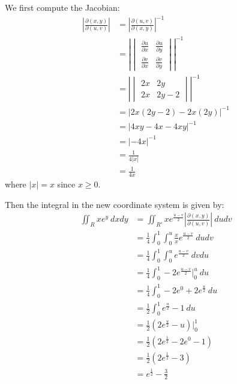 \begin{solution}
    We first compute the Jacobian:
    \begin{align*}
        \left|\frac{\partial(x, y)}{\partial(u, v)}\right| &= \left|\frac{\partial(u, v)}{\partial(x, y)}\right|^{-1} \\
        &= \left|\begin{vmatrix}
            \frac{\partial u}{\partial x} & \frac{\partial u}{\partial y} \\
            \frac{\partial v}{\partial x} & \frac{\partial v}{\partial y}
        \end{vmatrix}\right|^{-1} \\
        &= \left|\begin{vmatrix}
            2x & 2y \\
            2x & 2y - 2
        \end{vmatrix}\right|^{-1} \\
        &= \left|2x(2y - 2) - 2x(2y)\right|^{-1} \\
        &= \left|4xy - 4x - 4xy\right|^{-1} \\
        &= \left|-4x\right|^{-1} \\
        &= \frac{1}{4|x|} \\
        &= \frac{1}{4x}
    \end{align*}
    where \(|x| = x\) since \(x \geq 0\).
    
    Then the integral in the new coordinate system is given by:
    \begin{align*}
        \iint_R xe^y \ dxdy &= \iint_{R'} xe^{\frac{u - v}{2}} \left|\frac{\partial(x, y)}{\partial(u, v)}\right| \ du dv \\
        &= \frac{1}{4} \int_{0}^{1} \int_{0}^{u} \frac{x}{x}e^{\frac{u - v}{2}} \ du dv \\
        &= \frac{1}{4} \int_{0}^{1} \int_{0}^{u} e^{\frac{u - v}{2}} \ dv du \\
        &= \frac{1}{4} \int_{0}^{1} -2 e^{\frac{u - v}{2}} \Big|_{0}^{u} \ du \\
        &= \frac{1}{4} \int_{0}^{1} -2 e^{0} + 2 e^{\frac{u}{2}} \ du \\
        &= \frac{1}{2} \int_{0}^{1} e^{\frac{u}{2}} - 1 \ du \\
        &= \frac{1}{2} \left( 2 e^{\frac{u}{2}} - u\right)\Big|_{0}^{1} \\
        &= \frac{1}{2} \left( 2 e^{\frac{1}{2}} - 2e^0 - 1\right) \\
        &= \frac{1}{2} \left( 2 e^{\frac{1}{2}} - 3\right) \\
        &= e^{\frac{1}{2}} - \frac{3}{2}
    \end{align*}
\end{solution}